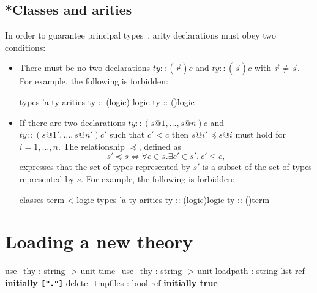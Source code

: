 \subsection{*Classes and arities}

In order to guarantee principal types~\cite{nipkow-prehofer},
arity declarations must obey two conditions:
\begin{itemize}
\item There must be no two declarations $ty :: (\vec{r})c$ and $ty ::
  (\vec{s})c$ with $\vec{r} \neq \vec{s}$.  For example, the following is
  forbidden:
\begin{ttbox}
types
  'a ty
arities
  ty :: ({\ttlbrace}logic{\ttrbrace}) logic
  ty :: ({\ttlbrace}{\ttrbrace})logic
\end{ttbox}

\item If there are two declarations $ty :: (s@1,\dots,s@n)c$ and $ty ::
  (s@1',\dots,s@n')c'$ such that $c' < c$ then $s@i' \preceq s@i$ must hold
  for $i=1,\dots,n$.  The relationship $\preceq$, defined as
\[ s' \preceq s \iff \forall c\in s. \exists c'\in s'.~ c'\le c, \]
expresses that the set of types represented by $s'$ is a subset of the set of
types represented by $s$.  For example, the following is forbidden:
\begin{ttbox}
classes
  term < logic
types
  'a ty
arities
  ty :: ({\ttlbrace}logic{\ttrbrace})logic
  ty :: ({\ttlbrace}{\ttrbrace})term
\end{ttbox}

\end{itemize}


\section{Loading a new theory}\label{LoadingTheories}
\begin{ttbox}
use_thy         : string -> unit
time_use_thy    : string -> unit
loadpath        : string list ref \hfill{\bf initially {\tt["."]}}
delete_tmpfiles : bool ref \hfill{\bf initially true}
\end{ttbox}

